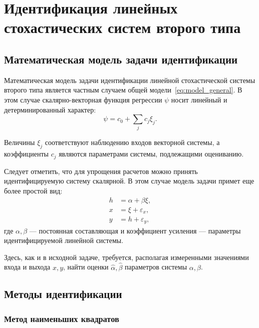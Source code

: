 \chapter[Идентификация линейных стохастических систем второго типа]{%
  Идентификация линейных стохастических систем второго типа
}

\section{Математическая модель задачи идентификации}

Математическая модель задачи идентификации линейной стохастической системы второго типа
является частным случаем общей модели~\eqref{eq:model_general}.
В этом случае скалярно-векторная функция регрессии \( \psi \) носит линейный и
детерминированный характер:
\begin{equation*}
  \psi = c_0 + \sum_j c_j \xi_j.
\end{equation*}

Величины \( \xi_j \) соответствуют наблюдению входов векторной системы,
а коэффициенты \( c_j \) являются параметрами системы, подлежащими оцениванию.

{\color{red}
Следует отметить,
что для упрощения расчетов можно принять идентифицируемую систему скалярной.
}
В этом случае модель задачи примет еще более простой вид:
\begin{equation}
  \label{eq:model_linear_scalar}
  \begin{aligned}
  h &= \alpha + \beta \xi, \\
  x &= \xi + \varepsilon_x, \\
  y &= h + \varepsilon_y,
  \end{aligned}
\end{equation}
где \( \alpha, \beta \) --- постоянная составляющая и коэффициент усиления ---
параметры идентифицируемой линейной системы.

Здесь, как и в исходной задаче, требуется,
располагая измеренными значениями входа и выхода \( x, y \),
найти оценки \( \hat{\alpha}, \hat{\beta} \) параметров системы \( \alpha, \beta \).


\section{Методы идентификации}

\subsection{Метод наименьших квадратов}

